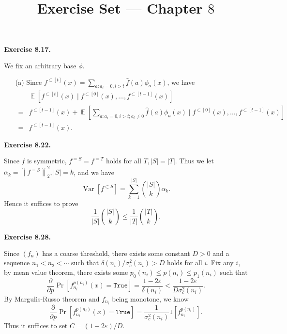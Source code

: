 \documentclass[a4paper]{article}
\title{Exercise Set --- Chapter $8$}
\date{}
\newenvironment{exercise}[1]{
	\par
	\noindent\textbf{Exercise #1.}\quad
}{
	\par
	\bigskip
}
\DeclareMathOperator*{\E}{\mathbb E}
\DeclareMathOperator{\Var}{\mathrm{Var}}
\newcommand{\eps}{\varepsilon}
\newcommand{\hvabs}[1]{{\hat{\|} #1 \hat{\|}}}
\newcommand{\sbra}[1]{{\left[ #1 \right]}}
\newcommand{\Itt}{\mathtt{I}}
\newcommand{\True}{\texttt{True}}
\begin{document}
\maketitle

\begin{exercise}{8.17}
    We fix an arbitrary base $\phi$.
    \begin{itemize}
        \item[(a)] Since $f^{\subset[t]}(x)=\sum_{a:a_i=0,i>t}\hat f(a)\phi_a(x)$, we have
            \begin{align*}
                &\E\sbra{f^{\subset[t]}(x)\mid f^{\subset[0]}(x),\ldots,f^{\subset[t-1]}(x)}\\
                =&f^{\subset[t-1]}(x)
            +\E\sbra{\sum_{a:a_i=0,i>t;a_t\neq0}\hat f(a)\phi_a(x)\mid f^{\subset[0]}(x),\ldots,f^{\subset[t-1]}(x)}\\
                =&f^{\subset[t-1]}(x).
            \end{align*}
    \end{itemize}
\end{exercise}

\begin{exercise}{8.22}
    Since $f$ is symmetric, $f^{=S}=f^{=T}$ holds for all $T,|S|=|T|$. Thus we let $\alpha_k=\hvabs{f^{=S}}_2^2,|S|=k$, and we have 
    $$
    \Var[f^{\subset S}]=\sum_{k=1}^{|S|}\binom{|S|}k\alpha_k.
    $$
    Hence it suffices to prove 
    $$
    \frac1{|S|}\binom{|S|}k\leq\frac1{|T|}\binom{|T|}k.
    $$
\end{exercise}

\begin{exercise}{8.28}
    Since $(f_n)$ has a coarse threshold, there exists some constant $D>0$ and a sequence $n_1<n_2<\cdots$ such that
    $\delta(n_i)/\sigma^2_c(n_i)>D$ holds for all $i$. Fix any $i$, by mean value theorem, there exists some $p_0(n_i)\leq p(n_i)\leq p_1(n_i)$ such that
    $$
    \frac{\partial}{\partial p}\Pr\sbra{f^{p(n_i)}_{n_i}(x)=\True}=\frac{1-2\eps}{\delta(n_i)}<\frac{1-2\eps}{D\sigma_c^2(n_i)}.
    $$
    By Margulis-Russo theorem and $f_{n_i}$ being monotone, we know
    $$
    \frac{\partial}{\partial p}\Pr\sbra{f^{p(n_i)}_{n_i}(x)=\True}=\frac1{\sigma_c^2(n_i)}\Itt\sbra{f_{n_i}^{p(n_i)}}.
    $$
    Thus it suffices to set $C=(1-2\eps)/D$.
\end{exercise}
\end{document}
